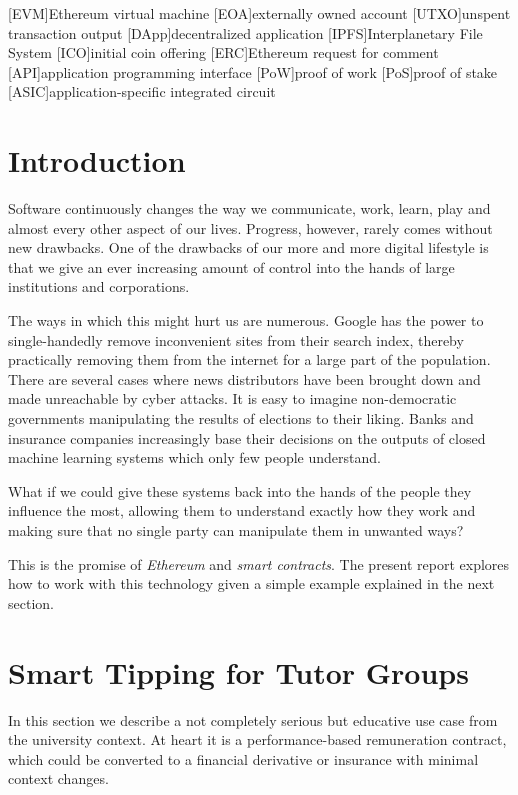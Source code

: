 \begin{acronym}
[EVM]{Ethereum virtual machine}
[EOA]{externally owned account}
[UTXO]{unspent transaction output}
[DApp]{decentralized application}
[IPFS]{Interplanetary File System}
[ICO]{initial coin offering}
[ERC]{Ethereum request for comment}
[API]{application programming interface}
[PoW]{proof of work}
[PoS]{proof of stake}
[ASIC]{application-specific integrated circuit}
\end{acronym}

\section{Introduction}
Software continuously changes the way we communicate, work, learn, play
and almost every other aspect of our lives.
Progress, however, rarely comes without new drawbacks.
One of the drawbacks of our more and more digital lifestyle is that we give an ever increasing amount
of control into the hands of large institutions and corporations.

The ways in which this might hurt us are numerous. Google has the
power to single-handedly remove inconvenient sites from their search index, thereby
practically removing them from the internet for a large part of
the population. There are several cases where news distributors
have been brought down and made unreachable by cyber attacks. It is
easy to imagine non-democratic governments manipulating the results
of elections to their liking. Banks and insurance companies
increasingly base their decisions on the outputs of closed machine learning
systems which only few people understand.

What if we could give these systems back into the hands of the people they
influence the most, allowing them to understand exactly how they work and
making sure that no single party can manipulate them in unwanted ways?


This is the promise of \emph{Ethereum} and \emph{smart contracts}.
The present report explores how to work with this technology
given a simple example explained in the next section.


\section{Smart Tipping for Tutor Groups}
\label{sec:demo}
In this section we describe a not completely serious but educative
use case from the university context. At heart it is a performance-based
remuneration contract, which could be converted to a financial
derivative or insurance with minimal context changes.


